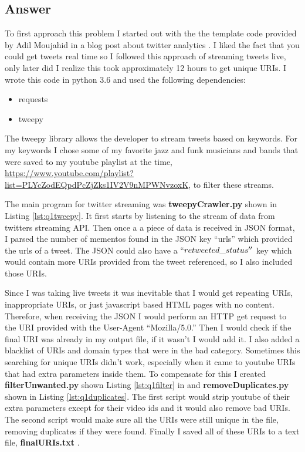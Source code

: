 \documentclass[letterpaper,11pt]{article}
\newcommand*{\srcPath}{../src}%
\begin{document}
\subsection*{Answer}

To first approach this problem I started out with the the template code provided by Adil Moujahid in a blog post about twitter analytics \cite{twitterstreamref}. I liked the fact that you could get tweets real time so I followed this approach of streaming tweets live, only later did I realize this took approximately 12 hours to get unique URIs. I wrote this code in python 3.6 and used the following dependencies:

\begin{itemize}
  \item requests
  \item tweepy
\end{itemize}

The tweepy library allows the developer to stream tweets based on keywords. For my keywords I chose some of my favorite jazz and funk musicians and bands that were saved to my youtube playlist at the time, \url{https://www.youtube.com/playlist?list=PLYcZodEQpdPcZjZks1IV2V9nMPWNvzoxK}, to filter these streams.

The main program for twitter streaming was \textbf{tweepyCrawler.py} shown in Listing \ref{lst:q1tweepy}. It first starts by listening to the stream of data from twitters streaming API. Then once a a piece of data is received in JSON format, I parsed the number of mementos found in the JSON key ``urls'' which provided the urls of a tweet. The JSON could also have a $``retweeted\char`_status''$ key which would contain more URIs provided from the tweet referenced, so I also included those URIs.



Since I was taking live tweets it was inevitable that I would get repeating URIs, inappropriate URIs, or just javascript based HTML pages with no content. Therefore, when receiving the JSON I would perform an HTTP get request to the URI provided with the User-Agent ``Mozilla/5.0.'' Then I would check if the final URI was already in my output file, if it wasn't I would add it. I also added a blacklist of URIs and domain types that were in the bad category. Sometimes this searching for unique URIs didn't work, especially when it came to youtube URIs that had extra parameters inside them. To compensate for this I created \textbf{filterUnwanted.py} shown Listing \ref{lst:q1filter} in and \textbf{removeDuplicates.py} shown in Listing \ref{lst:q1duplicates}. The first script would strip youtube of their extra parameters except for their video ids and it would also remove bad URIs. The second script would make sure all the URIs were still unique in the file, removing duplicates if they were found. Finally I saved all of these URIs to a text file, \textbf{finalURIs.txt} \cite{finalurisref}.
\end{document}
